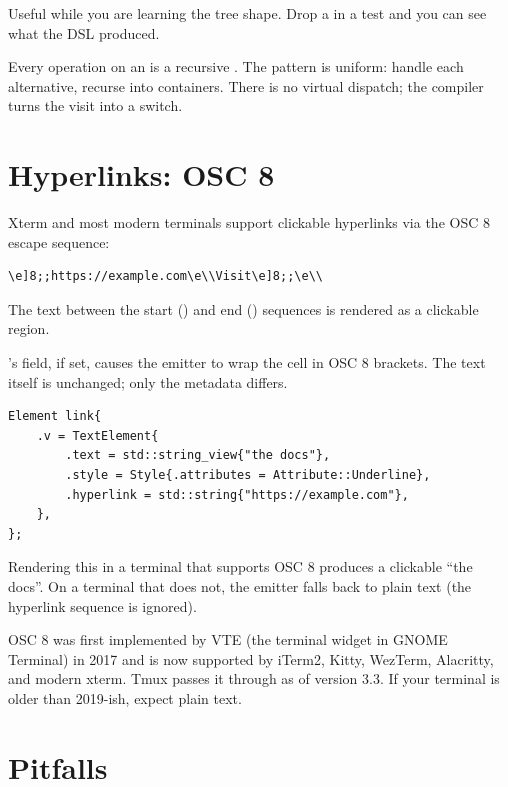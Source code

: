 Useful while you are learning the tree shape. Drop a
 in a test and you can see what the DSL
produced.

\begin{recap}
Every operation on an  is a recursive
. The pattern is uniform: handle each
alternative, recurse into containers. There is no virtual
dispatch; the compiler turns the visit into a switch.
\end{recap}

\section{Hyperlinks: OSC 8}

Xterm and most modern terminals support clickable hyperlinks via
the OSC 8 escape sequence:

\begin{lstlisting}
\e]8;;https://example.com\e\\Visit\e]8;;\e\\
\end{lstlisting}

The text between the start (\code{ESC ]8;;URL ESC \textbackslash})
and end (\code{ESC ]8;; ESC \textbackslash}) sequences is
rendered as a clickable region.

\maya{}'s  field, if set, causes the
emitter to wrap the cell in OSC 8 brackets. The text itself is
unchanged; only the metadata differs.

\begin{lstlisting}
Element link{
    .v = TextElement{
        .text = std::string_view{"the docs"},
        .style = Style{.attributes = Attribute::Underline},
        .hyperlink = std::string{"https://example.com"},
    },
};
\end{lstlisting}

Rendering this in a terminal that supports OSC 8 produces a
clickable ``the docs''. On a terminal that does not, the
emitter falls back to plain text (the hyperlink sequence is
ignored).

\begin{aside}
OSC 8 was first implemented by VTE (the terminal widget in
GNOME Terminal) in 2017 and is now supported by iTerm2, Kitty,
WezTerm, Alacritty, and modern xterm. Tmux passes it through
as of version 3.3. If your terminal is older than
2019-ish, expect plain text.
\end{aside}

\section{Pitfalls}

